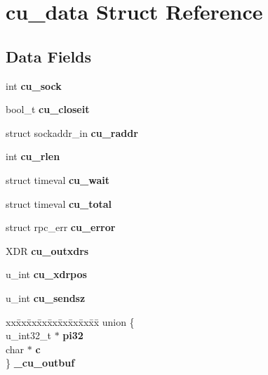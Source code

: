 \hypertarget{structcu__data}{}\section{cu\+\_\+data Struct Reference}
\label{structcu__data}
\subsection*{Data Fields}
\begin{DoxyCompactItemize}
\item 
\mbox{\label{structcu__data_a03758b077cc887938a7c5bef14693538}} 
int {\bfseries cu\+\_\+sock}
\item 
\mbox{\label{structcu__data_a01ffed15c404496727f6aefffd747d59}} 
bool\+\_\+t {\bfseries cu\+\_\+closeit}
\item 
\mbox{\label{structcu__data_acdf849ffc09af97dc2087f236fc0f6e3}} 
struct sockaddr\+\_\+in {\bfseries cu\+\_\+raddr}
\item 
\mbox{\label{structcu__data_a8a66684b60e42b5a607780f32ca937dd}} 
int {\bfseries cu\+\_\+rlen}
\item 
\mbox{\label{structcu__data_a1bab0087833328ada369308dcca6ad92}} 
struct timeval {\bfseries cu\+\_\+wait}
\item 
\mbox{\label{structcu__data_afacb52c7b5df3b4568520716834a919b}} 
struct timeval {\bfseries cu\+\_\+total}
\item 
\mbox{\label{structcu__data_a95e960a6a602b1c95a5325e3321aa4b9}} 
struct rpc\+\_\+err {\bfseries cu\+\_\+error}
\item 
\mbox{\label{structcu__data_aabf7154b265fac4d2ba598f80881c534}} 
X\+DR {\bfseries cu\+\_\+outxdrs}
\item 
\mbox{\label{structcu__data_aa587fdc508df8ffad30a49ca253554a9}} 
u\+\_\+int {\bfseries cu\+\_\+xdrpos}
\item 
\mbox{\label{structcu__data_a827876014bb55d2c2278e8d8ba89cf9a}} 
u\+\_\+int {\bfseries cu\+\_\+sendsz}
\item 
\mbox{\label{structcu__data_a4584923e1bd14e89ee3787caa3d4f847}} 
\begin{tabbing}
xx\=xx\=xx\=xx\=xx\=xx\=xx\=xx\=xx\=\kill
union \{\\
\>u\_int32\_t $\ast$ {\bfseries pi32}\\
\>char $\ast$ {\bfseries c}\\
\} {\bfseries \_cu\_outbuf}\\


\end{tabbing}
\end{DoxyCompactItemize}
